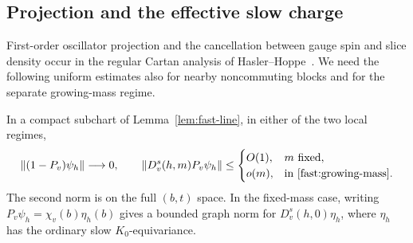 \subsection{Projection and the effective slow charge}

First-order oscillator projection and the cancellation between gauge
spin and slice density occur in the regular Cartan analysis of
Hasler--Hoppe~\cite{HaslerHoppeFactorization2002}. We need the following
uniform estimates also for nearby noncommuting blocks and for the
separate growing-mass regime.

\begin{lemma}
\label{lem:fast-projection}
In a compact subchart of Lemma~\ref{lem:fast-line}, in either of the
two local regimes,
\begin{equation}
 \|(1-P_v)\psi_h\|\longrightarrow0,
 \qquad
 \|D_v^s(h,m)P_v\psi_h\|
 \leq
 \begin{cases}
 O(1),&m\text{ fixed},\\
 o(m),&\text{in \eqref{fast:growing-mass}}.
 \end{cases}
 \label{eq:fast-projection}
\end{equation}
The second norm is on the full $(b,t)$ space. In the fixed-mass case,
writing $P_v\psi_h=\chi_v(b)\eta_h(b)$ gives a bounded graph norm
for $D_v^s(h,0)\eta_h$, where $\eta_h$ has the ordinary slow
$K_0$-equivariance.
\end{lemma}

